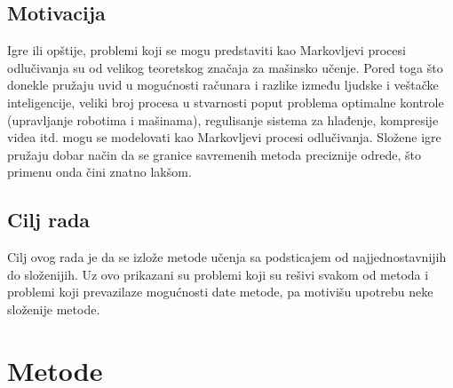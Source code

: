 \documentclass[a4paper,fleqn,12pt]{JMThesis}
\theoremstyle{plain}
\theoremstyle{definition}
\theoremstyle{definition}
\begin{document}
\section[Motivacija]{Motivacija}
Igre ili opštije, problemi koji se mogu predstaviti kao Markovljevi procesi odlučivanja su od velikog teoretskog značaja za mašinsko učenje. Pored toga što donekle pružaju uvid u mogućnosti računara i razlike između ljudske i veštačke inteligencije, veliki broj procesa u stvarnosti poput problema optimalne kontrole (upravljanje robotima i mašinama), regulisanje sistema za hlađenje, kompresije videa itd. mogu se modelovati kao Markovljevi procesi odlučivanja. Složene igre pružaju dobar način da se granice savremenih metoda preciznije odrede, što primenu onda čini znatno lakšom. 
\section [Cilj Rada]{Cilj rada}
Cilj ovog rada je da se izlože metode učenja sa podsticajem od najjednostavnijih do složenijih. Uz ovo prikazani su problemi koji su rešivi svakom od metoda i problemi koji prevazilaze mogućnosti date metode, pa motivišu upotrebu neke složenije metode.

\chapter[Metode]{Metode}
\end{document}
